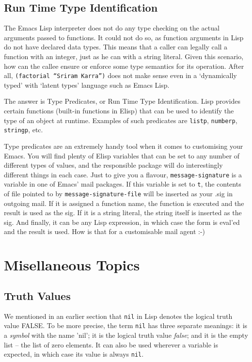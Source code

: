 \documentclass[10pt]{article}
\begin{document}
\subsection{Run Time Type Identification}

The Emacs Lisp interpreter does not do any type checking on the actual
arguments passed to functions.  It could not do so, as function arguments in
Lisp do not have declared data types.  This means that a caller can legally
call a function with an integer, just as he can with a string literal.  Given
this scenario, how can the callee ensure or enforce some type semantics for its
operation.  After all, \texttt{(factorial ``Sriram Karra'')} does not make
sense even in a `dynamically typed' with `latent types' language such as Emacs
Lisp.

The answer is Type Predicates, or Run Time Type Identification.  Lisp provides
certain functions (built-in functions in Elisp) that can be used to identify
the type of an object at runtime.  Examples of such predicates are
\texttt{listp}, \texttt{numberp}, \texttt{stringp}, etc.

Type predicates are an extremely handy tool when it comes to customising your
Emacs.  You will find plenty of Elisp variables that can be set to any number
of different types of values, and the responsible package will do interestingly
different things in each case.  Just to give you a flavour,
\texttt{message-signature} is a variable in one of Emacs' mail packages.  If
this variable is set to \texttt{t}, the contents of file pointed to by
\texttt{message-signature-file} will be inserted as your .sig in outgoing
mail.  If it is assigned a function name, the function is executed and the
result is used as the sig.  If it is a string literal, the string itself is
inserted as the sig.  And finally, it can be any Lisp expression, in which case
the form is eval'ed and the result is used.  How is that for a customisable
mail agent :-)

\section{Misellaneous Topics}

\subsection{Truth Values}

We mentioned in an earlier section that \texttt{nil} in Lisp denotes the
logical truth value FALSE.  To be more precise, the term \texttt{nil} has three
separate meanings: it is a \textit{symbol} with the name 'nil'; it is the
logical truth value \textit{false}; and it is the empty list -- the list of
zero elements.  It can also be used wherever a variable is expected, in which
case its value is always \texttt{nil}.
\end{document}
